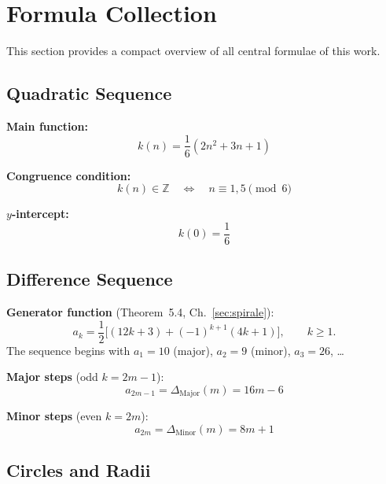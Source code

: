 \chapter{Formula Collection}

This section provides a compact overview of all central formulae of this work.

\section{Quadratic Sequence}

\textbf{Main function:}
\begin{equation}
k(n) = \frac{1}{6}(2n^2 + 3n + 1)
\end{equation}

\textbf{Congruence condition:}
\begin{equation}
k(n) \in \mathbb{Z}
\quad\Longleftrightarrow\quad
n \equiv 1,5 \pmod{6}
\end{equation}

\textbf{$y$-intercept:}
\begin{equation}
k(0) = \frac{1}{6}
\end{equation}

\section{Difference Sequence}

\textbf{Generator function} (Theorem~5.4, Ch.~\ref{sec:spirale}):
\begin{equation}
a_k = \frac{1}{2}\bigl[(12k+3) + (-1)^{k+1}(4k+1)\bigr], \qquad k \geq 1.
\end{equation}
The sequence begins with $a_1 = 10$ (major), $a_2 = 9$ (minor), $a_3 = 26$, \ldots

\textbf{Major steps} (odd $k = 2m-1$):
\begin{equation}
a_{2m-1} = \Delta_{\mathrm{Major}}(m) = 16m - 6
\end{equation}

\textbf{Minor steps} (even $k = 2m$):
\begin{equation}
a_{2m} = \Delta_{\mathrm{Minor}}(m) = 8m + 1
\end{equation}

\section{Circles and Radii}

